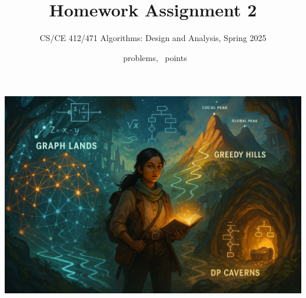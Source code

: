 \documentclass[a4paper]{exam}
\title{Homework Assignment 2}
\author{CS/CE 412/471 Algorithms: Design and Analysis, Spring 2025}
\date{\numquestions\ problems, \numpoints\ points}
\begin{document}
\maketitle
\thispagestyle{empty}

\includegraphics[trim=0 2cm 0 0cm, clip, width=\textwidth]{title}
\end{document}
